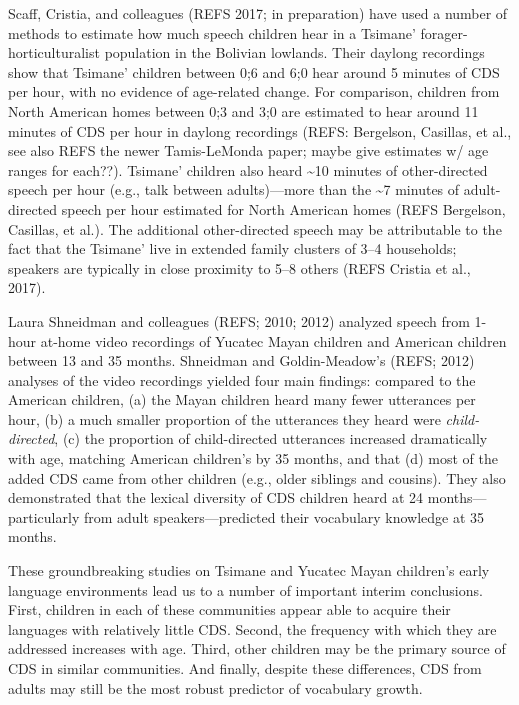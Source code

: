 \documentclass[man]{apa6}
\theoremstyle{definition}
\theoremstyle{definition}
\theoremstyle{definition}
\theoremstyle{remark}
\begin{document}
Scaff, Cristia, and colleagues (REFS 2017; in preparation) have used a
number of methods to estimate how much speech children hear in a
Tsimane' forager-horticulturalist population in the Bolivian lowlands.
Their daylong recordings show that Tsimane' children between 0;6 and 6;0
hear around 5 minutes of CDS per hour, with no evidence of age-related
change. For comparison, children from North American homes between 0;3
and 3;0 are estimated to hear around 11 minutes of CDS per hour in
daylong recordings (REFS: Bergelson, Casillas, et al., see also REFS the
newer Tamis-LeMonda paper; maybe give estimates w/ age ranges for
each??). Tsimane' children also heard \textasciitilde{}10 minutes of
other-directed speech per hour (e.g., talk between adults)---more than
the \textasciitilde{}7 minutes of adult-directed speech per hour
estimated for North American homes (REFS Bergelson, Casillas, et al.).
The additional other-directed speech may be attributable to the fact
that the Tsimane' live in extended family clusters of 3--4 households;
speakers are typically in close proximity to 5--8 others (REFS Cristia
et al., 2017).

Laura Shneidman and colleagues (REFS; 2010; 2012) analyzed speech from
1-hour at-home video recordings of Yucatec Mayan children and American
children between 13 and 35 months. Shneidman and Goldin-Meadow's (REFS;
2012) analyses of the video recordings yielded four main findings:
compared to the American children, (a) the Mayan children heard many
fewer utterances per hour, (b) a much smaller proportion of the
utterances they heard were \emph{child-directed}, (c) the proportion of
child-directed utterances increased dramatically with age, matching
American children's by 35 months, and that (d) most of the added CDS
came from other children (e.g., older siblings and cousins). They also
demonstrated that the lexical diversity of CDS children heard at 24
months---particularly from adult speakers---predicted their vocabulary
knowledge at 35 months.

These groundbreaking studies on Tsimane and Yucatec Mayan children's
early language environments lead us to a number of important interim
conclusions. First, children in each of these communities appear able to
acquire their languages with relatively little CDS. Second, the
frequency with which they are addressed increases with age. Third, other
children may be the primary source of CDS in similar communities. And
finally, despite these differences, CDS from adults may still be the
most robust predictor of vocabulary growth.
\end{document}
